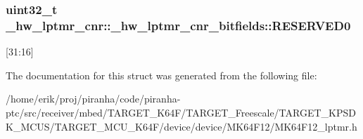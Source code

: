 \subsubsection[{\texorpdfstring{R\+E\+S\+E\+R\+V\+E\+D0}{RESERVED0}}]{\setlength{\rightskip}{0pt plus 5cm}uint32\+\_\+t \+\_\+hw\+\_\+lptmr\+\_\+cnr\+::\+\_\+hw\+\_\+lptmr\+\_\+cnr\+\_\+bitfields\+::\+R\+E\+S\+E\+R\+V\+E\+D0}\hypertarget{struct__hw__lptmr__cnr_1_1__hw__lptmr__cnr__bitfields_a714c2a57af58c6ef643e1df8dae59cfc}{}\label{struct__hw__lptmr__cnr_1_1__hw__lptmr__cnr__bitfields_a714c2a57af58c6ef643e1df8dae59cfc}
\mbox{[}31\+:16\mbox{]} 

The documentation for this struct was generated from the following file\+:\begin{DoxyCompactItemize}
\item 
/home/erik/proj/piranha/code/piranha-\/ptc/src/receiver/mbed/\+T\+A\+R\+G\+E\+T\+\_\+\+K64\+F/\+T\+A\+R\+G\+E\+T\+\_\+\+Freescale/\+T\+A\+R\+G\+E\+T\+\_\+\+K\+P\+S\+D\+K\+\_\+\+M\+C\+U\+S/\+T\+A\+R\+G\+E\+T\+\_\+\+M\+C\+U\+\_\+\+K64\+F/device/device/\+M\+K64\+F12/M\+K64\+F12\+\_\+lptmr.\+h\end{DoxyCompactItemize}
